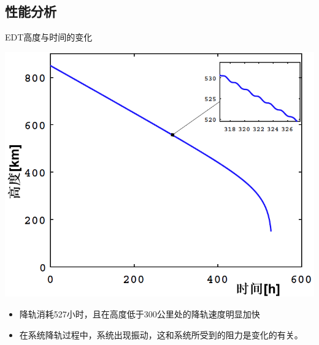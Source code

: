 \documentclass[sectioncirclenumberstyle]{le2iutbmbeamer}
\begin{document}
\subsection{性能分析}
\begin{frame}{EDT高度与时间的变化}
\begin{minipage}{0.6\textwidth}
\begin{center}
\includegraphics[width=1\linewidth]{figures/tHg}
\end{center}
\end{minipage}%
\begin{minipage}{0.4\textwidth}
\begin{itemize}
\item 降轨消耗527小时，且在高度低于300公里处的降轨速度明显加快
\item 在系统降轨过程中，系统出现振动，这和系统所受到的阻力是变化的有关。
\end{itemize}
\end{minipage}
\end{frame}
\end{document}
